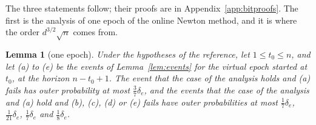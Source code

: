 \documentclass[11pt]{amsart}
\newtheorem{lemma}[theorem]{Lemma}
\theoremstyle{definition}
\numberwithin{equation}{section}
\begin{document}
The three statements follow; their proofs are in Appendix~\ref{app:bitproofs}. The first is the analysis of one epoch of the online Newton method, and it is where the order $d^{3/2}\sqrt n$ comes from.

\begin{lemma}[one epoch]\label{lem:ve}
Under the hypotheses of the reference, let $1\le t_0\le n$, and let (a) to (e) be the events of Lemma~\ref{lem:events} for the virtual epoch started at $t_0$, at the horizon $n-t_0+1$. The event that the case of the analysis holds and (a) fails has outer probability at most $\frac37\delta_e$, and the events that the case of the analysis and (a) hold and (b), (c), (d) or (e) fails have outer probabilities at most $\frac17\delta_e$, $\frac1{21}\delta_e$, $\frac17\delta_e$ and $\frac18\delta_e$.
\end{lemma}
\end{document}
